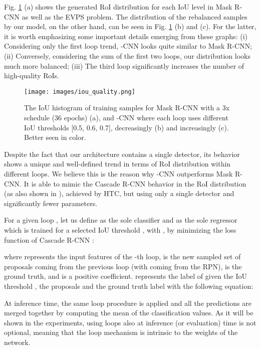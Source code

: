 \documentclass[runningheads, orivec]{llncs}
\begin{document}
Fig. \ref{fig:iou-histogram} (a) shows the generated RoI distribution for each IoU level in Mask R-CNN as well as the EVPS problem.
The distribution of the rebalanced samples by our model, on the other hand, can be seen in Fig. \ref{fig:iou-histogram} (b) and (c).
For the latter, it is worth emphasizing some important details emerging from these graphs: (i) Considering only the first loop trend, -CNN looks quite similar to Mask R-CNN; (ii) Conversely, considering the sum of the first two loops, our distribution looks much more balanced; (iii) The third loop significantly increases the number of high-quality RoIs.
\begin{figure}[t]
	\begin{center}
		\texttt{[image: images/iou\_quality.png]}
	\end{center}
	\caption{The IoU histogram of training samples for Mask R-CNN with a 3x schedule (36 epochs) (a), and -CNN where each loop uses different IoU thresholds [0.5, 0.6, 0.7], decreasingly (b) and increasingly (c). Better seen in color.}
	\label{fig:iou-histogram}
\end{figure}
Despite the fact that our architecture contains a single detector, its behavior shows a unique and well-defined trend in terms of RoI distribution within different loops.
We believe this is the reason why -CNN outperforms Mask R-CNN.
It is able to mimic the Cascade R-CNN behavior in the RoI distribution (as also shown in \cite{Cai_2018_CVPR}), achieved by HTC, but using only a single detector and significantly fewer parameters.


For a given loop , let us define  as the sole classifier and  as the sole regressor which is trained for a selected IoU threshold , with , by minimizing the loss function of Cascade R-CNN \cite{Cai_2018_CVPR}:


\noindent where  represents the input features of the -th loop,  is the new sampled set of proposals coming from the previous loop (with  coming from the RPN),  is the ground truth, and  is a positive coefficient.
 represents the label of  given the IoU threshold , the proposals  and the ground truth label  with the following equation:


At inference time, the same loop procedure is applied and all the predictions are merged together by computing the mean of the classification values.
As it will be shown in the experiments, using loops also at inference (or evaluation) time is not optional, meaning that the loop mechanism is intrinsic to the weights of the network.
\end{document}
